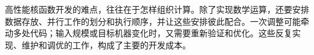 高性能核函数开发的难点，往往在于怎样组织计算。除了实现数学运算，还要安排数据存放、并行工作的划分和执行顺序，并让这些安排彼此配合。一次调整可能牵动多处代码；输入规模或目标机器变化时，又需要重新验证和优化。这些反复实现、维护和调优的工作，构成了主要的开发成本。
